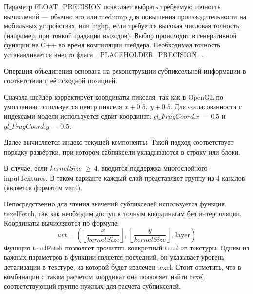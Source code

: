 \documentclass[a4paper,14pt]{extreport}
\begin{document}
            Параметр FLOAT\_PRECISION позволяет выбрать требуемую точность вычислений — обычно это или mediump для повышения производительности на мобильных устройствах, или highp, если требуется высокая числовая точность (например, при тонкой градации выходов). Выбор происходит в генеративной функции на C++ во время компиляции шейдера. Необходимая точность устанавливается вместо флага \_PLACEHOLDER\_PRECISION\_.
            
            
            Операция объединения основана на реконструкции субпиксельной информации в соответствии с её исходной позицией.
    
            Сначала шейдер корректирует координаты пикселя, так как в OpenGL по умолчанию используется центр пикселя $x + 0.5,\ y + 0.5$. Для согласованности с индексами модели используется сдвиг координат: $gl\_FragCoord.x\ -\ 0.5$ и $gl\_FragCoord.y\ -\ 0.5$.
            
            Далее вычисляется индекс текущей компоненты. Такой подход соответствует порядку развёртки, при котором сабпиксели укладываются в строку или блоки.
            
            
            В случае, если $kernelSize\ \ge\ 4$, вводится поддержка многослойного inputTextures. В таком варианте каждый слой представляет группу из 4 каналов (является форматом vec4).
            
            Непосредственно для чтения значений субпикселей используется функция texelFetch, так как необходим доступ к точным координатам без интерполяции. Координаты вычисляются по формуле:
            \begin{equation}
            uvt = \left( \left\lfloor \frac{x}{kernelSize} \right\rfloor,\ \left\lfloor \frac{y}{kernelSize} \right\rfloor,\ \text{layer} \right)
            \end{equation}
            Функция texelFetch позволяет прочитать конкретный texel из текстуры. Одним из важных параметров в функции является последний, он указывает уровень детализации в текстуре, из которой будет извлечен texel. Стоит отметить, что в комбинации с таким расчетом координат она позволяет найти texel, соответствующий группе нужных для расчета субпикселей.
            
            
\end{document}
